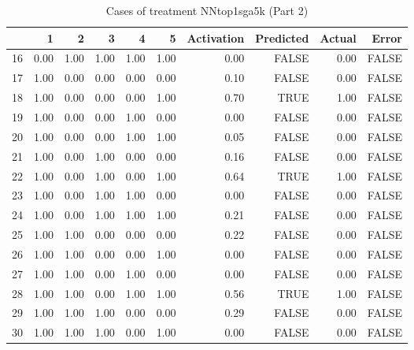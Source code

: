 \begin{table}[ht]
\centering
\begin{tabular}{rrrrrrrrrr}
  \hline
 & 1 & 2 & 3 & 4 & 5 & Activation & Predicted & Actual & Error \\ 
  \hline
16 & 0.00 & 1.00 & 1.00 & 1.00 & 1.00 & 0.00 & FALSE & 0.00 & FALSE \\ 
  17 & 1.00 & 0.00 & 0.00 & 0.00 & 0.00 & 0.10 & FALSE & 0.00 & FALSE \\ 
  18 & 1.00 & 0.00 & 0.00 & 0.00 & 1.00 & 0.70 & TRUE & 1.00 & FALSE \\ 
  19 & 1.00 & 0.00 & 0.00 & 1.00 & 0.00 & 0.00 & FALSE & 0.00 & FALSE \\ 
  20 & 1.00 & 0.00 & 0.00 & 1.00 & 1.00 & 0.05 & FALSE & 0.00 & FALSE \\ 
  21 & 1.00 & 0.00 & 1.00 & 0.00 & 0.00 & 0.16 & FALSE & 0.00 & FALSE \\ 
  22 & 1.00 & 0.00 & 1.00 & 0.00 & 1.00 & 0.64 & TRUE & 1.00 & FALSE \\ 
  23 & 1.00 & 0.00 & 1.00 & 1.00 & 0.00 & 0.00 & FALSE & 0.00 & FALSE \\ 
  24 & 1.00 & 0.00 & 1.00 & 1.00 & 1.00 & 0.21 & FALSE & 0.00 & FALSE \\ 
  25 & 1.00 & 1.00 & 0.00 & 0.00 & 0.00 & 0.22 & FALSE & 0.00 & FALSE \\ 
  26 & 1.00 & 1.00 & 0.00 & 0.00 & 1.00 & 0.00 & FALSE & 0.00 & FALSE \\ 
  27 & 1.00 & 1.00 & 0.00 & 1.00 & 0.00 & 0.00 & FALSE & 0.00 & FALSE \\ 
  28 & 1.00 & 1.00 & 0.00 & 1.00 & 1.00 & 0.56 & TRUE & 1.00 & FALSE \\ 
  29 & 1.00 & 1.00 & 1.00 & 0.00 & 0.00 & 0.29 & FALSE & 0.00 & FALSE \\ 
  30 & 1.00 & 1.00 & 1.00 & 0.00 & 1.00 & 0.00 & FALSE & 0.00 & FALSE \\ 
   \hline
\end{tabular}
\caption{Cases of treatment NNtop1sga5k (Part 2)} 
\end{table}
